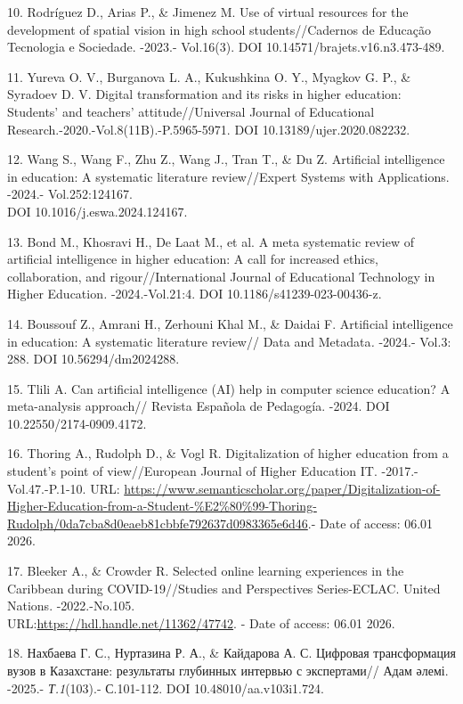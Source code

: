\begin{refs}
10. Rodríguez D., Arias P., \& Jimenez M. Use of virtual resources for
the development of spatial vision in high school students//Cadernos de
Educação Tecnologia e Sociedade. -2023.- Vol.16(3). DOI
10.14571/brajets.v16.n3.473-489.

11. Yureva O. V., Burganova L. A., Kukushkina O. Y., Myagkov G. P., \&
Syradoev D. V. Digital transformation and its risks in higher education:
Students' and teachers' attitude//Universal Journal of Educational
Research.-2020.-Vol.8(11B).-P.5965-5971. DOI 10.13189/ujer.2020.082232.

12. Wang S., Wang F., Zhu Z., Wang J., Tran T., \& Du Z. Artificial
intelligence in education: A systematic literature review//Expert
Systems with Applications. -2024.- Vol.252:124167.\\
DOI 10.1016/j.eswa.2024.124167.

13. Bond M., Khosravi H., De Laat M., et al. A meta systematic review of
artificial intelligence in higher education: A call for increased
ethics, collaboration, and rigour//International Journal of Educational
Technology in Higher Education\emph{.} -2024.-Vol.21:4. DOI
10.1186/s41239-023-00436-z.

14. Boussouf Z., Amrani H., Zerhouni Khal M., \& Daidai F. Artificial
intelligence in education: A systematic literature review// Data and
Metadata\emph{.} -2024.- Vol.3: 288. DOI 10.56294/dm2024288.

15. Tlili A. Can artificial intelligence (AI) help in computer science
education? A meta-analysis approach// Revista Española de Pedagogía.
-2024. DOI 10.22550/2174-0909.4172.

16. Thoring A., Rudolph D., \& Vogl R. Digitalization of higher
education from a student's point of view//European Journal of Higher
Education IT. -2017.- Vol.47.-P.1-10. URL:
\url{https://www.semanticscholar.org/paper/Digitalization-of-Higher-Education-from-a-Student-\%E2\%80\%99-Thoring-Rudolph/0da7cba8d0eaeb81cbbfe792637d0983365e6d46}.-
Date of access: 06.01 2026.

17. Bleeker A., \& Crowder R. Selected online learning experiences in
the Caribbean during COVID-19//Studies and Perspectives Series-ECLAC.
United Nations. -2022.-No.105.\\
URL:\url{https://hdl.handle.net/11362/47742}. - Date of access: 06.01
2026.

18. Нахбаева Г. С., Нуртазина Р. А., \& Кайдарова А. С. Цифровая
трансформация вузов в Казахстане: результаты глубинных интервью с
экспертами// Адам әлемі. -2025.- \emph{Т.1}(103).- С.101-112. DOI
10.48010/aa.v103i1.724.


\end{refs}
